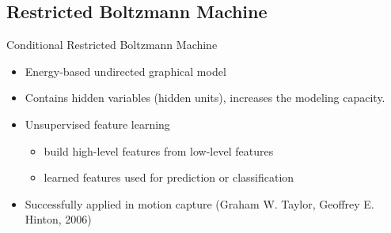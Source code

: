 \subsection{Restricted Boltzmann Machine}
	\begin{frame}[t]{Conditional Restricted Boltzmann Machine}
	 \begin{itemize}
	  \itemsep10pt
	  \item Energy-based undirected graphical model
	  \item Contains hidden variables (hidden units), increases the modeling capacity.  
	  \item Unsupervised feature learning 
		  \begin{itemize}
		   \item build high-level features from low-level features 
		   \item learned features used for prediction or classification
		  \end{itemize}
	  \item Successfully applied in motion capture (Graham W. Taylor, Geoffrey E. Hinton, 2006)
	 \end{itemize}
	\end{frame}
	
